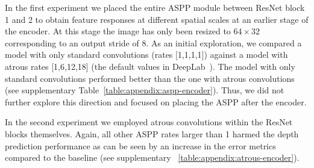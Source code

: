 In the first experiment we placed the entire ASPP module between ResNet block 1 and 2 to obtain feature responses at different spatial scales at an earlier stage of the encoder.
At this stage the image has only been resized to $64\times32$ corresponding to an output stride of 8. As an initial exploration, we compared a model with only standard convolutions  (rates [1,1,1,1]) against a model with atrous rates [1,6,12,18] (the default values in DeepLab~\cite{chen2018deeplab}). The model with only standard convolutions performed better than the one with atrous convolutions (see supplementary Table~\ref{table:appendix:aspp-encoder}). Thus, we did not further explore this direction and focused on placing the ASPP after the encoder.

In the second experiment we employed atrous convolutions within the ResNet blocks themselves. Again, all other ASPP rates larger than 1 harmed the depth prediction performance as can be seen by an increase in the error metrics compared to the baseline (see supplementary \tablename~\ref{table:appendix:atrous-encoder}).

